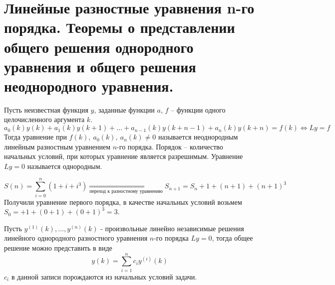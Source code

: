 \section{Линейные разностные уравнения n-го порядка.
  Теоремы о представлении общего решения однородного уравнения
  и общего решения неоднородного уравнения.
 }

\begin{definition}
  Пусть неизвестная функция $y$, заданные функции $a$, $f$
  -- функции одного целочисленного аргумента $k$.
  \[ a_0(k)y(k)+a_1(k)y(k+1)+\ldots+a_{n-1}(k)y(k+n-1)+a_n(k)y(k+n)=f(k) \Leftrightarrow Ly=f \]
  Тогда уравнение при $f(k),\ a_0(k),\ a_n(k) \neq 0$ называется
  неоднородным линейным разностным уравнением $n$-го порядка.
  Порядок -- количество начальных условий, при которых уравнение
  является разрешимым. Уравнение $Ly = 0$ называется однородным.
\end{definition}
\begin{example}
  \[S(n)=\sum_{i=0}^{n}(1+i+i^3)\underset{\text{переход к разностному уравнению}}{\Rightarrow}S_{n+1}=S_n+1+(n+1)+(n+1)^3\]
  Получили уравнение первого порядка, в качестве начальных условий возьмем $S_0=+1+(0+1)+(0+1)^3=3$.
\end{example}
\begin{theorem}
  Пусть $y^{(1)}(k),\ldots,y^{(n)}(k)$ - произвольные линейно независимые
  решения линейного однородного разностного уравнения $n$-го порядка
  $Ly=0$, тогда общее решение можно представить в виде
  \[y(k)=\sum_{i=1}^{n}c_iy^{(i)}(k)\]
  $c_i$ в данной записи порождаются из начальных условий задачи.
\end{theorem}
